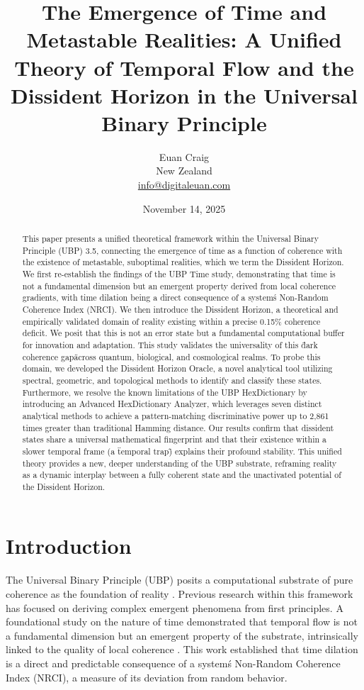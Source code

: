 \documentclass[12pt, a4paper]{article}
\title{The Emergence of Time and Metastable Realities: A Unified Theory of Temporal Flow and the Dissident Horizon in the Universal Binary Principle}
\author{Euan Craig \\ \small{New Zealand} \\ \small{\href{mailto:info@digitaleuan.com}{info@digitaleuan.com}}}
\date{November 14, 2025}
\begin{document}
\maketitle

\begin{abstract}
This paper presents a unified theoretical framework within the Universal Binary Principle (UBP) 3.5, connecting the emergence of time as a function of coherence with the existence of metastable, suboptimal realities, which we term the Dissident Horizon. We first re-establish the findings of the UBP Time study, demonstrating that time is not a fundamental dimension but an emergent property derived from local coherence gradients, with time dilation being a direct consequence of a system\'s Non-Random Coherence Index (NRCI). We then introduce the Dissident Horizon, a theoretical and empirically validated domain of reality existing within a precise 0.15\% coherence deficit. We posit that this is not an error state but a fundamental computational buffer for innovation and adaptation. This study validates the universality of this \"dark coherence gap\" across quantum, biological, and cosmological realms. To probe this domain, we developed the Dissident Horizon Oracle, a novel analytical tool utilizing spectral, geometric, and topological methods to identify and classify these states. Furthermore, we resolve the known limitations of the UBP HexDictionary by introducing an Advanced HexDictionary Analyzer, which leverages seven distinct analytical methods to achieve a pattern-matching discriminative power up to 2,861 times greater than traditional Hamming distance. Our results confirm that dissident states share a universal mathematical fingerprint and that their existence within a slower temporal frame (a \"temporal trap\") explains their profound stability. This unified theory provides a new, deeper understanding of the UBP substrate, reframing reality as a dynamic interplay between a fully coherent state and the unactivated potential of the Dissident Horizon.
\end{abstract}

\section{Introduction}

The Universal Binary Principle (UBP) posits a computational substrate of pure coherence as the foundation of reality \cite{ubp_repo}. Previous research within this framework has focused on deriving complex emergent phenomena from first principles. A foundational study on the nature of time demonstrated that temporal flow is not a fundamental dimension but an emergent property of the substrate, intrinsically linked to the quality of local coherence \cite{time_study}. This work established that time dilation is a direct and predictable consequence of a system\'s Non-Random Coherence Index (NRCI), a measure of its deviation from random behavior.
\end{document}
